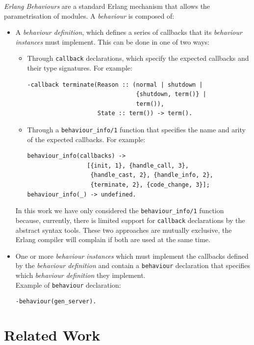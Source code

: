 \emph{Erlang Behaviours} are a standard Erlang mechanism that allows the
parametrisation of modules. A \emph{behaviour} is composed of:
\begin{itemize}
\item A \emph{behaviour definition}, which defines a series of callbacks
that its \emph{behaviour instances} must implement. This can be done
in one of two ways:

\begin{itemize}
\item Through \texttt{callback} declarations, which specify the expected
callbacks and their type signatures. For example:\begin{verbatim}
-callback terminate(Reason :: (normal | shutdown |
                               {shutdown, term()} |
                               term()),
                    State :: term()) -> term().
\end{verbatim}
\item Through a \texttt{behaviour\_info/1} function that specifies the name
and arity of the expected callbacks. For example:\begin{verbatim}
behaviour_info(callbacks) ->
                 [{init, 1}, {handle_call, 3},
                  {handle_cast, 2}, {handle_info, 2},
                  {terminate, 2}, {code_change, 3}];
behaviour_info(_) -> undefined.
\end{verbatim}
\end{itemize}

In this work we have only considered the \texttt{behaviour\_info/1}
function because, currently, there is limited support for \texttt{callback}
declarations by the abstract syntax tools. These two approaches are
mutually exclusive, the Erlang compiler will complain if both are
used at the same time.

\item One or more \emph{behaviour instances} which must implement the callbacks
defined by the \emph{behaviour definition} and contain a \texttt{behaviour}
declaration that specifies which \emph{behaviour definition} they
implement. \\
Example of \texttt{behaviour} declaration:\begin{verbatim}
-behaviour(gen_server).
\end{verbatim}
\end{itemize}

\section{Related Work}
\label{related_work}

